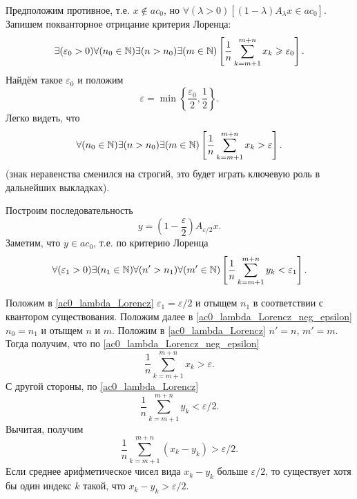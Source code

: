 Предположим противное, т.е. $x\notin ac_0$,
но $\forall(\lambda>0)[(1-\lambda)A_\lambda x \in ac_0]$.
Запишем покванторное отрицание критерия Лоренца:
\begin{equation}\label{ac0_lambda_Lorencz_neg}
	\exists(\varepsilon_0 > 0)
	\forall(n_0 \in \N)
	\exists(n > n_0)
	\exists(m \in \N)
	\left[
		\frac{1}{n}\sum_{k=m+1}^{m+n} x_k \geq \varepsilon_0
	\right]
	.
\end{equation}
Найдём такое $\varepsilon_0$ и положим
\begin{equation}
	\varepsilon = \min\left\{ \frac{\varepsilon_0}{2}, \frac{1}{2} \right\}
	.
\end{equation}
Легко видеть, что
\begin{equation}\label{ac0_lambda_Lorencz_neg_epsilon}
	\forall(n_0 \in \N)
	\exists(n > n_0)
	\exists(m \in \N)
	\left[
		\frac{1}{n}\sum_{k=m+1}^{m+n} x_k > \varepsilon
	\right]
	.
\end{equation}
(знак неравенства сменился на строгий, это будет играть ключевую роль в дальнейших выкладках).

Построим последовательность
\begin{equation}
	y = \left( 1 - \frac{\varepsilon}{2} \right) A_{\varepsilon/2} x
	.
\end{equation}
Заметим, что $y\in ac_0$, т.е. по критерию Лоренца
\begin{equation}\label{ac0_lambda_Lorencz}
	\forall(\varepsilon_1 > 0)
	\exists(n_1 \in \N)
	\forall(n' > n_1)
	\forall(m' \in \N)
	\left[
		\frac{1}{n}\sum_{k=m+1}^{m+n} y_k < \varepsilon_1
	\right]
	.
\end{equation}

Положим в \eqref{ac0_lambda_Lorencz} $\varepsilon_1 = \varepsilon/2$
и отыщем $n_1$ в соответствии с квантором существования.
Положим далее в \eqref{ac0_lambda_Lorencz_neg_epsilon}
$n_0 = n_1$ и отыщем $n$ и $m$.
Положим в \eqref{ac0_lambda_Lorencz} $n' = n$, $m' = m$.
Тогда получим, что по \eqref{ac0_lambda_Lorencz_neg_epsilon}
\begin{equation}
	\frac{1}{n}\sum_{k=m+1}^{m+n} x_k > \varepsilon
	.
\end{equation}
С другой стороны, по \eqref{ac0_lambda_Lorencz}
\begin{equation}
	\frac{1}{n}\sum_{k=m+1}^{m+n} y_k < \varepsilon/2
	.
\end{equation}
Вычитая, получим
\begin{equation}
	\frac{1}{n}\sum_{k=m+1}^{m+n} (x_k - y_k) > \varepsilon/2
	.
\end{equation}
Если среднее арифметическое чисел вида $x_k - y_k$ больше $\varepsilon/2$,
то существует хотя бы один индекс $k$ такой, что $x_k - y_k > \varepsilon/2$.

